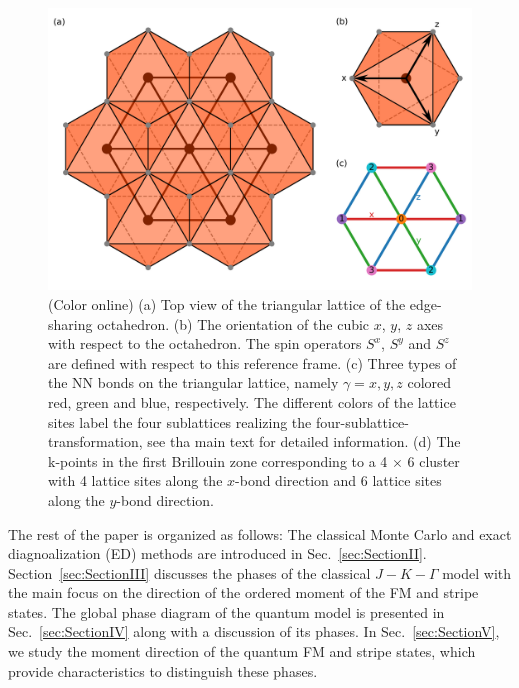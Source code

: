 \documentclass[aps,prb,reprint,amsfonts,amsmath,amssymb,showpacs,groupedaddress,superscriptaddress]{revtex4-1}
\begin{document}
\begin{figure}
    \includegraphics[width=\columnwidth]{Fig1.pdf}
    \caption{\label{fig:ModelDefinition}(Color online) (a) Top view of the triangular lattice of the edge-sharing octahedron. (b) The orientation of the cubic $x$, $y$, $z$ axes with respect to the octahedron. The spin operators $S^x$, $S^y$ and $S^z$ are defined with respect to this reference frame. (c) Three types of the NN bonds on the triangular lattice, namely $\gamma=x, y, z$ colored red, green and blue, respectively. The different colors of the lattice sites label the four sublattices realizing the four-sublattice-transformation, see tha main text for detailed information. (d) The k-points in the first Brillouin zone corresponding to a 4 $\times$ 6 cluster with 4 lattice sites along the $x$-bond direction and 6 lattice sites along the $y$-bond direction.}
\end{figure}

The rest of the paper is organized as follows: The classical Monte Carlo and exact diagnoalization (ED) methods are introduced in Sec.~\ref{sec:SectionII}. Section~\ref{sec:SectionIII} discusses the phases of the classical $J-K-\Gamma$ model with the main focus on the direction of the ordered moment of the FM and stripe states. The global phase diagram of the quantum model is presented in Sec.~\ref{sec:SectionIV} along with a discussion of its phases. In Sec.~\ref{sec:SectionV}, we study the moment direction of the quantum FM and stripe states, which provide characteristics to distinguish these phases.
\end{document}
